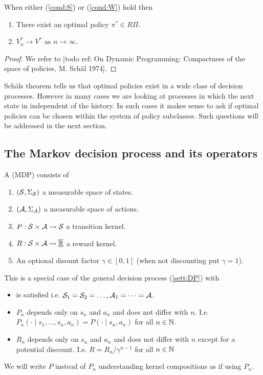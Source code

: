 \begin{thm}[Schäl]
  When either (\cref{cond:S}) or (\cref{cond:W}) hold then
  \begin{enumerate}
    \item There exist an optimal policy $\pi^* \in R\Pi$.
    \item $V^*_n \to V^*$ as $n \to \infty$.
  \end{enumerate}
  \label{thm:SchalExi}
\end{thm}
\begin{proof}
  We refer to [todo ref: On Dynamic Programming: Compactness of the space of
  policies, M. Schäl 1974]. %
\end{proof}

Schäls theorem tells us that optimal policies exist in a wide class
of decision processes. However in many cases we are looking at processes
in which the next state in independent of the history.
In such cases it makes sense to ask if optimal policies can be chosen
within the system of policy subclasses.
Such questions will be addressed in the next section.

\subsection{The Markov decision process and its operators}

\begin{defn}
  A  (MDP) consists of
  \begin{enumerate}
    \item $(\mathcal{S}, \Sigma_{\mathcal{S}})$ a 
      measurable space of states.
    \item $(\mathcal{A}, \Sigma_{\mathcal{A}})$ a 
      measurable space of actions.
    \item $P : \mathcal{S} \times \mathcal{A} \leadsto \mathcal{S}$
      a transition kernel.
    \item $R : \mathcal{S} \times \mathcal{A} \leadsto \overline{\underline{\mathbb{R}}}$
      a reward kernel.
    \item An optional disount factor $\gamma \in [0,1]$
      (when not discounting put $\gamma = 1$).
  \end{enumerate}
  \label{sett:MDP}
\end{defn}
This is a special case of the general decision process (\cref{sett:DP}) with
\begin{itemize}
  \item {} is satisfied i.e. 
    $\mathcal{S}_1 = \mathcal{S}_2 = \dots, \mathcal{A}_1 = \dots = \mathcal{A}$.
  \item $P_n$ depends only on $s_n$ and $a_n$ and does not
    differ with $n$. I.e. 
    $P_n(\cdot \mid s_1, \dots, s_n, a_n) = P(\cdot \mid s_n, a_n)$
    for all $n \in \mathbb{N}$.
  \item $R_n$ depends only on $s_n$ and $a_n$ and does not differ
    with $n$ except for a potential discount.
    I.e. $R = R_n/\gamma^{n-1}$ for all $n \in \mathbb{N}$
\end{itemize}
We will write $P$ instead of $P_n$ understanding
kernel compositions as if using $P_n$.

